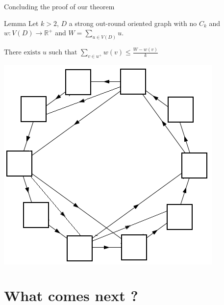 \documentclass{beamer}
\begin{document}
\begin{frame}{Concluding the proof of our theorem}
\begin{block}{Lemma}
Let $k>2$, $D$ a strong out-round oriented graph with no $C_k$ and $w : V(D) \rightarrow \mathbb{R}^{+}$ and $W = \sum_{u \in V(D)} u$.

$\text{There exists }u\text{ such that }\sum_{v\in u^+} w(v) \leq \frac{W-w(v)}{k}$
\end{block}

\centering
\includegraphics[scale=0.5]{Images/decomposition_reversed.png}

\end{frame}

\section{What comes next ?}
\end{document}
